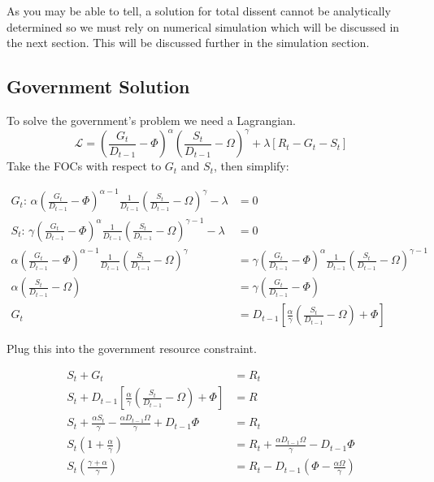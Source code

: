 \documentclass[12pt]{article}
\begin{document}
\begin{spacing}{1.5}
As you may be able to tell, a solution for total dissent cannot be analytically determined so we must rely on numerical simulation which will be discussed in the next section. This will be discussed further in the simulation section. 

\subsection{Government Solution}

To solve the government's problem we need a Lagrangian.
\begin{equation}
\mathcal{L} = \left(\frac{G_t}{ D_{t-1}}-\Phi\right)^\alpha \left(\frac{S_t}{ D_{t-1}}-\Omega\right)^\gamma  +\lambda[R_t-G_t-S_t] 
\end{equation}
Take the FOCs with respect to $G_t$ and $S_t$, then simplify:

\begin{equation}
    \begin{aligned}
        G_t\text{: } \alpha \left(\frac{G_t}{ D_{t-1}}-\Phi\right)^{\alpha-1} \frac{1}{ D_{t-1}} \left(\frac{S_t}{D_{t-1}}-\Omega\right)^\gamma  -\lambda &=0  \\
S_t\text{: } \gamma  \left(\frac{G_t}{ D_{t-1}}-\Phi\right)^{\alpha} \frac{1}{D_{t-1}} \left(\frac{S_t}{D_{t-1}}-\Omega\right)^{\gamma -1} -\lambda &=0 \\
\alpha \left(\frac{G_t}{D_{t-1}}-\Phi\right)^{\alpha-1} \frac{1}{ D_{t-1}} \left(\frac{S_t}{D_{t-1}}-\Omega\right)^\gamma  &= \gamma  \left(\frac{G_t}{ D_{t-1}}-\Phi\right)^{\alpha} \frac{1}{ D_{t-1}} \left(\frac{S_t}{ D_{t-1}}-\Omega\right)^{\gamma -1} \\
\alpha \left(\frac{S_t}{ D_{t-1}}-\Omega \right) &= \gamma  \left( \frac{G_t}{ D_{t-1}}-\Phi \right) \\
G_t&= D_{t-1}\left[\frac{\alpha}{\gamma } \left(\frac{S_t}{ D_{t-1}} -\Omega \right)+\Phi \right]
    \end{aligned}
\end{equation}

\noindent Plug this into the government resource constraint. 

\begin{equation}
    \begin{aligned}
        S_t+G_t&=R_t \\
        S_t+  D_{t-1}\left[\frac{\alpha}{\gamma } \left(\frac{S_t}{ D_{t-1}} -\Omega \right) +\Phi \right]  &= R \\
S_t+ \frac{\alpha S_t}{\gamma } -\frac{\alpha  D_{t-1} \Omega}{\gamma } +D_{t-1}\Phi &=R_t \\
S_t\left(1+\frac{\alpha}{\gamma }\right) &= R_t+ \frac{\alpha D_{t-1} \Omega}{\gamma } - D_{t-1}\Phi \\
S_t\left(\frac{\gamma  + \alpha}{\gamma }\right) &= R_t - D_{t-1} \left(\Phi - \frac{\alpha  \Omega}{\gamma } \right) 
    \end{aligned}
\end{equation}


\end{spacing}
\end{document}
